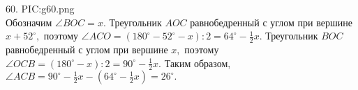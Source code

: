 60. {{PIC:g60.png}}\\
Обозначим $\angle BOC=x.$ Треугольник $AOC$ равнобедренный с углом при вершине $x+52^\circ,$ поэтому $\angle ACO=(180^\circ-52^\circ-x):2=64^\circ-\frac{1}{2}x.$ Треугольник $BOC$ равнобедренный с углом при вершине $x,$ поэтому $\angle OCB=(180^\circ-x):2=90^\circ-\frac{1}{2}x.$ Таким образом, $\angle ACB=90^\circ-\frac{1}{2}x-(64^\circ-\frac{1}{2}x)=26^\circ.$\\
